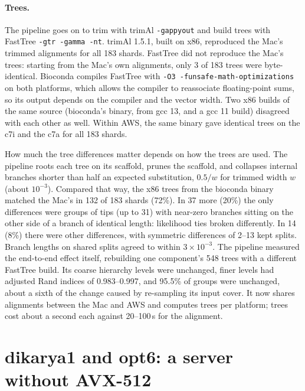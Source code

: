\documentclass[11pt]{article}
\newcommand{\code}[1]{\texttt{#1}}
\begin{document}
\paragraph{Trees.} The pipeline goes on to trim with trimAl \code{-gappyout} and build trees
with FastTree \code{-gtr -gamma -nt}. trimAl 1.5.1, built on x86, reproduced the Mac's
trimmed alignments for all 183 shards. FastTree did not reproduce the Mac's trees: starting
from the Mac's own alignments, only 3 of 183 trees were byte-identical. Bioconda compiles
FastTree with \code{-O3 -funsafe-math-optimizations} on both platforms, which allows the
compiler to reassociate floating-point sums, so its output depends on the compiler and the
vector width. Two x86 builds of the same source (bioconda's binary, from gcc 13, and a
gcc 11 build) disagreed with each other as well. Within AWS, the same binary gave
identical trees on the c7i and the c7a for all 183 shards.

How much the tree differences matter depends on how the trees are used. The pipeline roots each
tree on its scaffold, prunes the scaffold, and collapses internal branches shorter than half
an expected substitution, $0.5/w$ for trimmed width $w$ (about $10^{-3}$). Compared that way,
the x86 trees from the bioconda binary matched the Mac's in 132 of 183 shards (72\%). In 37
more (20\%) the only differences were groups of tips (up to 31) with near-zero branches
sitting on the other side of a branch of identical length: likelihood ties broken
differently. In 14 (8\%) there were other differences, with symmetric differences of 2--13
kept splits. Branch lengths on shared splits agreed to within $3\times10^{-3}$. The pipeline
measured the end-to-end effect itself, rebuilding one component's 548 trees with a different
FastTree build. Its coarse hierarchy levels were unchanged, finer levels had adjusted Rand
indices of 0.983--0.997, and 95.5\% of groups were unchanged, about a sixth of the change
caused by re-sampling its input cover. It now shares alignments between the Mac and AWS and
computes trees per platform; trees cost about a second each against 20--100\,s for the alignment.

\section{dikarya1 and opt6: a server without AVX-512}
\label{sec:dikarya}
\end{document}
